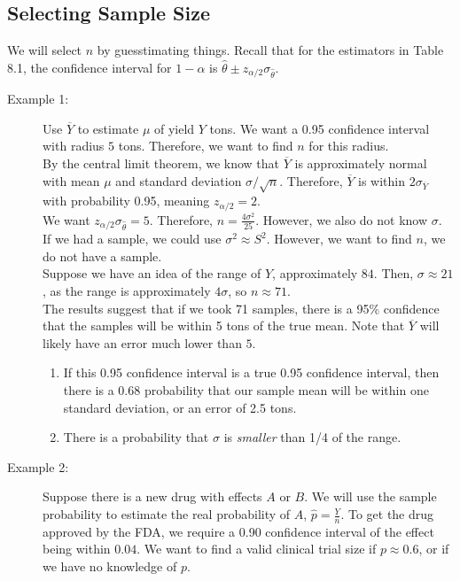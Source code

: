 \documentclass[10pt]{extarticle}
\begin{document}
  \subsection{Selecting Sample Size}%
  We will select $n$ by guesstimating things. Recall that for the estimators in Table 8.1, the confidence interval for $1-\alpha$ is $\hat{\theta} \pm z_{\alpha/2}\sigma_{\hat{\theta}}$.
  \begin{description}
    \item[Example 1:] Use $\overline{Y}$ to estimate $\mu$ of yield $Y$ tons. We want a 0.95 confidence interval with radius $5$ tons. Therefore, we want to find $n$ for this radius.\\

      By the central limit theorem, we know that $\overline{Y}$ is approximately normal with mean $\mu$ and standard deviation $\sigma/\sqrt{n}$. Therefore, $\overline{Y}$ is within $2\sigma_{\overline{Y}}$ with probability 0.95, meaning $z_{\alpha/2} = 2$.\\

      We want $z_{\alpha/2} \sigma_{\hat{\theta}} = 5$. Therefore, $n = \frac{4\sigma^2}{25}$. However, we also do not know $\sigma$. If we had a sample, we could use $\sigma^2 \approx S^2$. However, we want to find $n$, we do not have a sample.\\

      Suppose we have an idea of the range of $Y$, approximately $84$. Then, $\sigma \approx 21$, as the range is approximately $4\sigma$, so $n\approx 71$.\\

      The results suggest that if we took 71 samples, there is a 95\% confidence that the samples will be within 5 tons of the true mean. Note that $\overline{Y}$ will likely have an error much lower than $5$.
      \begin{enumerate}[(1)]
        \item If this 0.95 confidence interval is a true 0.95 confidence interval, then there is a 0.68 probability that our sample mean will be within one standard deviation, or an error of 2.5 tons.
        \item There is a probability that $\sigma$ is \textit{smaller} than 1/4 of the range.
      \end{enumerate}
    \item[Example 2:] Suppose there is a new drug with effects $A$ or $B$. We will use the sample probability to estimate the real probability of $A$, $\hat{p} = \frac{Y}{n}$. To get the drug approved by the FDA, we require a 0.90 confidence interval of the effect being within $0.04$. We want to find a valid clinical trial size if $p\approx 0.6$, or if we have no knowledge of $p$.\\


\end{description}
\end{document}
